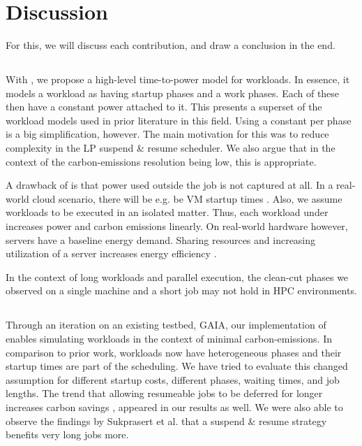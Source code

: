 \chapter{Discussion} \label{sec:discussion}

For this, we will discuss each contribution, and draw a conclusion in the end.

\section{\modelname{}}

With \modelname{}, we propose a high-level time-to-power model for workloads.
In essence, it models a workload as having startup phases and a work phases. 
Each of these then have a constant power attached to it. 
This presents a superset of the workload models used in prior literature in this field.
Using a constant per phase is a big simplification, however. 
The main motivation for this was to reduce complexity in the LP suspend \& resume scheduler.
We also argue that in the context of the carbon-emissions resolution being low, this is appropriate.

A drawback of \modelname{} is that power used outside the job is not captured at all.
In a real-world cloud scenario, there will be e.g. be VM startup times \cite{zheng_benchmarking_2019}.
Also, we assume workloads to be executed in an isolated matter. 
Thus, each workload under \modelname{} increases power and carbon emissions linearly.
On real-world hardware however, servers have a baseline energy demand. 
Sharing resources and increasing utilization of a server increases energy efficiency \cite{barroso_case_2007}.

In the context of long workloads and parallel execution, the clean-cut phases we observed on a single machine and a short job may 
not hold in HPC environments.

\section{\programname{}}

Through an iteration on an existing testbed, GAIA, our implementation of \programname{} enables simulating workloads in the context of minimal carbon-emissions.
In comparison to prior work, workloads now have heterogeneous phases and their startup times are part of the scheduling.
We have tried to evaluate this changed assumption for different startup costs, different phases, waiting times, and job lengths. 
The trend that allowing resumeable jobs to be deferred for longer increases carbon savings \cite{wiesner_lets_2021,hanafy_going_2024, hanafy_war_2023}, appeared in our results as well. 
We were also able to observe the findings by Sukprasert et al. \cite{sukprasert_limitations_2024} that a suspend \& resume strategy benefits very long jobs more.

